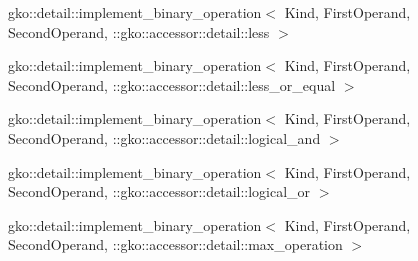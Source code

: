 \begin{DoxyCompactList}
\begin{DoxyCompactList}
\end{DoxyCompactList}
\item gko\+:\+:detail\+:\+:implement\+\_\+binary\+\_\+operation$<$ Kind, First\+Operand, Second\+Operand, \+:\+:gko\+:\+:accessor\+:\+:detail\+:\+:less $>$\begin{DoxyCompactList}
\item {}
\end{DoxyCompactList}
\item gko\+:\+:detail\+:\+:implement\+\_\+binary\+\_\+operation$<$ Kind, First\+Operand, Second\+Operand, \+:\+:gko\+:\+:accessor\+:\+:detail\+:\+:less\+\_\+or\+\_\+equal $>$\begin{DoxyCompactList}
\item {}
\end{DoxyCompactList}
\item gko\+:\+:detail\+:\+:implement\+\_\+binary\+\_\+operation$<$ Kind, First\+Operand, Second\+Operand, \+:\+:gko\+:\+:accessor\+:\+:detail\+:\+:logical\+\_\+and $>$\begin{DoxyCompactList}
\item {}
\end{DoxyCompactList}
\item gko\+:\+:detail\+:\+:implement\+\_\+binary\+\_\+operation$<$ Kind, First\+Operand, Second\+Operand, \+:\+:gko\+:\+:accessor\+:\+:detail\+:\+:logical\+\_\+or $>$\begin{DoxyCompactList}
\item {}
\end{DoxyCompactList}
\item gko\+:\+:detail\+:\+:implement\+\_\+binary\+\_\+operation$<$ Kind, First\+Operand, Second\+Operand, \+:\+:gko\+:\+:accessor\+:\+:detail\+:\+:max\+\_\+operation $>$\begin{DoxyCompactList}
\item {}

\end{DoxyCompactList}
\end{DoxyCompactList}
